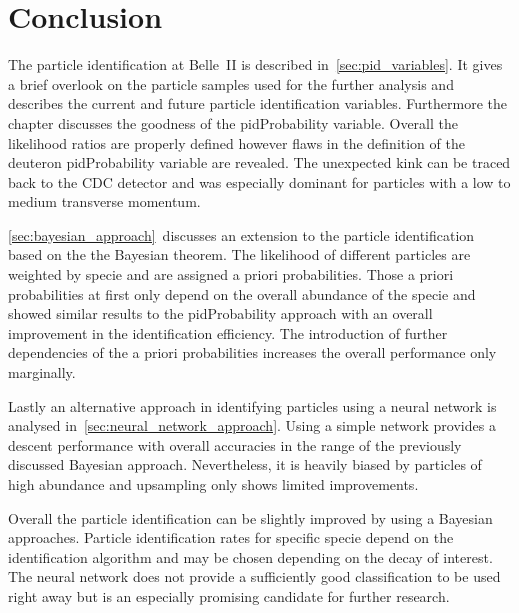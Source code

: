 \chapter{Conclusion}
\label{chap:conclusion}

The particle identification at Belle~\RN{2} is described in~\autoref{sec:pid_variables}. It gives a brief overlook on the particle samples used for the further analysis and describes the current and future particle identification variables. Furthermore the chapter discusses the goodness of the pidProbability variable. Overall the likelihood ratios are properly defined however flaws in the definition of the deuteron pidProbability variable are revealed. The unexpected kink can be traced back to the CDC detector and was especially dominant for particles with a low to medium transverse momentum.

\autoref{sec:bayesian_approach}~discusses an extension to the particle identification based on the the Bayesian theorem. The likelihood of different particles are weighted by specie and are assigned a priori probabilities. Those a priori probabilities at first only depend on the overall abundance of the specie and showed similar results to the pidProbability approach with an overall improvement in the identification efficiency. The introduction of further dependencies of the a priori probabilities increases the overall performance only marginally.

Lastly an alternative approach in identifying particles using a neural network is analysed in~\autoref{sec:neural_network_approach}. Using a simple network provides a descent performance with overall accuracies in the range of the previously discussed Bayesian approach. Nevertheless, it is heavily biased by particles of high abundance and upsampling only shows limited improvements.

Overall the particle identification can be slightly improved by using a Bayesian approaches. Particle identification rates for specific specie depend on the identification algorithm and may be chosen depending on the decay of interest. The neural network does not provide a sufficiently good classification to be used right away but is an especially promising candidate for further research.

